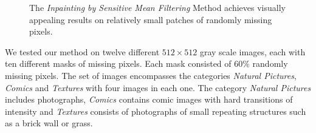 \documentclass[10pt,conference,compsocconf]{IEEEtran}
\begin{document}
\begin{figure}[ht]
\centering
{}
\caption[]{The \emph{Inpainting by Sensitive Mean Filtering} Method achieves visually appealing results on relatively small patches of randomly missing pixels.\label{fig:pepper_results}}
\end{figure}

We tested our method on twelve different $512 \times 512$ gray scale images, each with ten different masks of missing pixels. Each mask consisted of $60\%$ randomly missing pixels. The set of images encompasses the categories \emph{Natural Pictures}, \emph{Comics} and \emph{Textures} with four images in each one. The category \emph{Natural Pictures} includes photographs, \emph{Comics} contains comic images with hard transitions of intensity and \emph{Textures} consists of photographs of small repeating structures such as a brick wall or grass.
\end{document}
